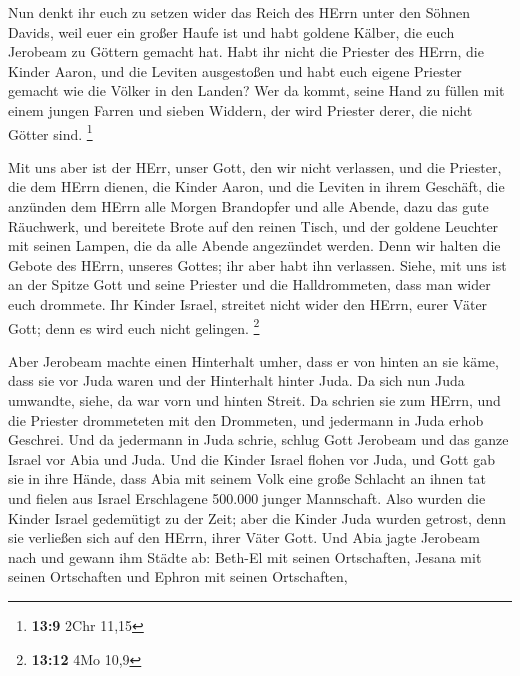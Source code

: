  Nun denkt ihr euch zu setzen wider das Reich des HErrn
unter den Söhnen Davids, weil euer ein großer Haufe ist und habt goldene
Kälber, die euch Jerobeam zu Göttern gemacht hat.  Habt ihr
nicht die Priester des HErrn, die Kinder Aaron, und die Leviten
ausgestoßen und habt euch eigene Priester gemacht wie die Völker in den
Landen? Wer da kommt, seine Hand zu füllen mit einem jungen Farren und
sieben Widdern, der wird Priester derer, die nicht Götter sind.
\footnote{\textbf{13:9} 2Chr 11,15}

 Mit uns aber ist der HErr, unser Gott, den wir nicht
verlassen, und die Priester, die dem HErrn dienen, die Kinder Aaron, und
die Leviten in ihrem Geschäft,  die anzünden dem HErrn alle
Morgen Brandopfer und alle Abende, dazu das gute Räuchwerk, und
bereitete Brote auf den reinen Tisch, und der goldene Leuchter mit
seinen Lampen, die da alle Abende angezündet werden. Denn wir halten die
Gebote des HErrn, unseres Gottes; ihr aber habt ihn verlassen.
 Siehe, mit uns ist an der Spitze Gott und seine Priester
und die Halldrommeten, dass man wider euch drommete. Ihr Kinder Israel,
streitet nicht wider den HErrn, eurer Väter Gott; denn es wird euch
nicht gelingen. \footnote{\textbf{13:12} 4Mo 10,9}

 Aber Jerobeam machte einen Hinterhalt umher, dass er von
hinten an sie käme, dass sie vor Juda waren und der Hinterhalt hinter
Juda.  Da sich nun Juda umwandte, siehe, da war vorn und
hinten Streit. Da schrien sie zum HErrn, und die Priester drommeteten
mit den Drommeten,  und jedermann in Juda erhob Geschrei.
Und da jedermann in Juda schrie, schlug Gott Jerobeam und das ganze
Israel vor Abia und Juda.  Und die Kinder Israel flohen vor
Juda, und Gott gab sie in ihre Hände,  dass Abia mit seinem
Volk eine große Schlacht an ihnen tat und fielen aus Israel Erschlagene
500.000 junger Mannschaft.  Also wurden die Kinder Israel
gedemütigt zu der Zeit; aber die Kinder Juda wurden getrost, denn sie
verließen sich auf den HErrn, ihrer Väter Gott.  Und Abia
jagte Jerobeam nach und gewann ihm Städte ab: Beth-El mit seinen
Ortschaften, Jesana mit seinen Ortschaften und Ephron mit seinen
Ortschaften,

